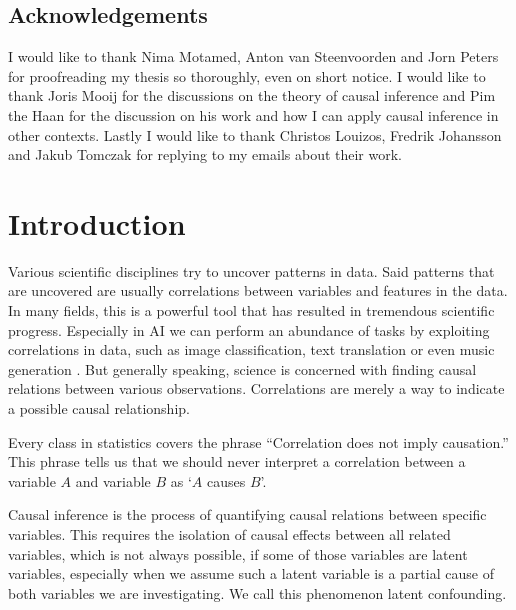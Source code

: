 \documentclass{report}
\begin{document}
\section*{Acknowledgements}
I would like to thank Nima Motamed, Anton van Steenvoorden and Jorn Peters for proofreading my thesis so thoroughly, even on short notice. I would like to thank Joris Mooij for the discussions on the theory of causal inference and Pim the Haan for the discussion on his work and how I can apply causal inference in other contexts. Lastly I would like to thank Christos Louizos, Fredrik Johansson and Jakub Tomczak for replying to my emails about their work.


\tableofcontents


\chapter{Introduction}
Various scientific disciplines try to uncover patterns in data. Said patterns that are uncovered are usually correlations between variables and features in the data. In many fields, this is a powerful tool that has resulted in tremendous scientific progress. Especially in AI we can perform an abundance of tasks by exploiting correlations in data, such as image classification, text translation or even music generation \parencite[][]{deng2009imagenet, krizhevsky2012imagenet, bahdanau2014neural, payne2019musenet}. %
But generally speaking, science is concerned with finding causal relations between various observations. Correlations are merely a way to indicate a possible causal relationship. 

Every class in statistics covers the phrase ``Correlation does not imply causation.'' This phrase tells us that we should never interpret a correlation between a variable $A$ and variable $B$ as `$A$ causes $B$'. 

Causal inference is the process of quantifying causal relations between specific variables. This requires the isolation of causal effects between all related variables, which is not always possible, if some of those variables are latent variables, especially when we assume such a latent variable is a partial cause of both variables we are investigating. We call this phenomenon latent confounding.
\end{document}
